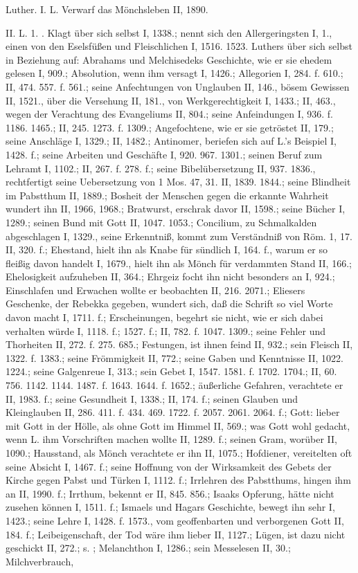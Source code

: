 Luther. I.  L. Verwarf das Mönchsleben II, 1890.

II.  L. 1. . Klagt über sich selbst I, 1338.; nennt sich den Allergeringsten I, 1., einen von den Eselsfüßen und Fleischlichen I, 1516. 1523.  Luthers über sich selbst in Beziehung auf: Abrahams und Melchisedeks Geschichte, wie er sie ehedem gelesen I, 909.; Absolution, wenn ihm versagt I, 1426.; Allegorien I, 284. f. 610.; II, 474. 557. f. 561.; seine Anfechtungen von Unglauben II, 146., bösem Gewissen II, 1521., über die Versehung II, 181., von Werkgerechtigkeit I, 1433.; II, 463., wegen der Verachtung des Evangeliums II, 804.; seine Anfeindungen I, 936. f. 1186. 1465.; II, 245. 1273. f. 1309.; Angefochtene, wie er sie getröstet II, 179.; seine Anschläge I, 1329.; II, 1482.; Antinomer, beriefen sich auf L.’s Beispiel I, 1428. f.; seine Arbeiten und Geschäfte I, 920. 967. 1301.; seinen Beruf zum Lehramt I, 1102.; II, 267. f. 278. f.; seine Bibelübersetzung II, 937. 1836., rechtfertigt seine Uebersetzung von 1 Mos. 47, 31. II, 1839. 1844.; seine Blindheit im Pabstthum II, 1889.; Bosheit der Menschen gegen die erkannte Wahrheit wundert ihn II, 1966, 1968.; Bratwurst, erschrak davor II, 1598.; seine Bücher I, 1289.; seinen Bund mit Gott II, 1047. 1053.; Concilium, zu Schmalkalden abgeschlagen I, 1329., seine Erkenntniß, kommt zum Verständniß von Röm. 1, 17. II, 320. f.; Ehestand, hielt ihn als Knabe für sündlich I, 164. f., warum er so fleißig davon handelt I, 1679., hielt ihn als Mönch für verdammten Stand II, 166.; Ehelosigkeit aufzuheben II, 364.; Ehrgeiz focht ihn nicht besonders an I, 924.; Einschlafen und Erwachen wollte er beobachten II, 216. 2071.; Eliesers Geschenke, der Rebekka gegeben, wundert sich, daß die Schrift so viel Worte davon macht I, 1711. f.; Erscheinungen, begehrt sie nicht, wie er sich dabei verhalten würde I, 1118. f.; 1527. f.; II, 782. f. 1047. 1309.; seine Fehler und Thorheiten II, 272. f. 275. 685.; Festungen, ist ihnen feind II, 932.; sein Fleisch II, 1322. f. 1383.; seine Frömmigkeit II, 772.; seine Gaben und Kenntnisse II, 1022. 1224.; seine Galgenreue I, 313.; sein Gebet I, 1547. 1581. f. 1702. 1704.; II, 60. 756. 1142. 1144. 1487. f. 1643. 1644. f. 1652.; äußerliche Gefahren, verachtete er II, 1983. f.; seine Gesundheit I, 1338.; II, 174. f.; seinen Glauben und Kleinglauben II, 286. 411. f. 434. 469. 1722. f. 2057. 2061. 2064. f.; Gott: lieber mit Gott in der Hölle, als ohne Gott im Himmel II, 569.; was Gott wohl gedacht, wenn L. ihm Vorschriften machen wollte II, 1289. f.; seinen Gram, worüber II, 1090.; Hausstand, als Mönch verachtete er ihn II, 1075.; Hofdiener, vereitelten oft seine Absicht I, 1467. f.; seine Hoffnung von der Wirksamkeit des Gebets der Kirche gegen Pabst und Türken I, 1112. f.; Irrlehren des Pabstthums, hingen ihm an II, 1990. f.; Irrthum, bekennt er II, 845. 856.; Isaaks Opferung, hätte nicht zusehen können I, 1511. f.; Ismaels und Hagars Geschichte, bewegt ihn sehr I, 1423.; seine Lehre I, 1428. f. 1573., vom geoffenbarten und verborgenen Gott II, 184. f.; Leibeigenschaft, der Tod wäre ihm lieber II, 1127.; Lügen, ist dazu nicht geschickt II, 272.; s. ; Melanchthon I, 1286.; sein Messelesen II, 30.; Milchverbrauch, 